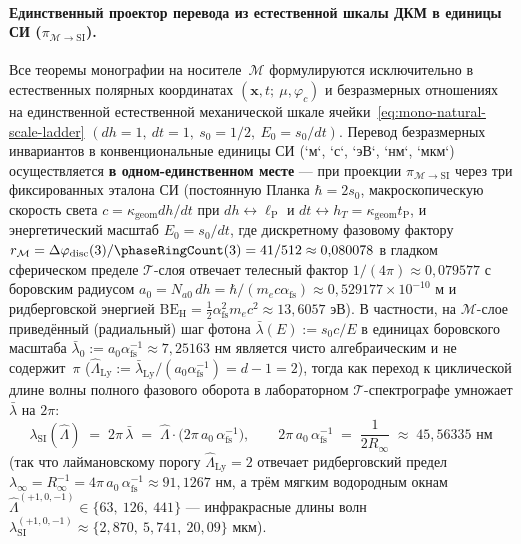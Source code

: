 \paragraph{Единственный проектор перевода из естественной шкалы ДКМ в единицы СИ ($\pi_{\mathcal{M}\to\mathrm{SI}}$).}
Все теоремы монографии на носителе~$\mathcal{M}$ формулируются исключительно в естественных полярных координатах $(\mathbf{x}, t;\ \mu, \varphi_c)$ и безразмерных отношениях на единственной естественной механической шкале ячейки~\eqref{eq:mono-natural-scale-ladder} $(dh = 1,\ dt = 1,\ s_0 = 1/2,\ E_0 = s_0/dt)$. Перевод безразмерных инвариантов в конвенциональные единицы СИ (`м`, `с`, `эВ`, `нм`, `мкм`) осуществляется \textbf{в одном-единственном месте} --- при проекции $\pi_{\mathcal{M}\to\mathrm{SI}}$ через три фиксированных эталона СИ (постоянную Планка $\hbar = 2 s_0$, макроскопическую скорость света $c = \kappa_{\mathrm{geom}} dh / dt$ при $dh \leftrightarrow \ell_{\mathrm{P}}$ и $dt \leftrightarrow h_T = \kappa_{\mathrm{geom}} t_{\mathrm{P}}$, и энергетический масштаб $E_0 = s_0 / dt$, где дискретному фазовому фактору $r_{\mathcal{M}} = \Delta\varphi_{\mathrm{disc}}(3)/\phaseRingCount(3) = 41/512 \approx 0{,}080078$ в гладком сферическом пределе $\mathcal{T}$-слоя отвечает телесный фактор $1/(4\pi) \approx 0{,}079577$ с боровским радиусом $a_0 = N_{a0}\,dh = \hbar / (m_e c \alpha_{\mathrm{fs}}) \approx 0{,}529177\times 10^{-10}\text{ м}$ и ридберговской энергией $\mathrm{BE}_{\mathrm{H}} = \frac{1}{2}\alpha_{\mathrm{fs}}^2 m_e c^2 \approx 13{,}6057\text{ эВ}$). В частности, на $\mathcal{M}$-слое приведённый (радиальный) шаг фотона $\bar{\lambda}(E) := s_0 c / E$ в единицах боровского масштаба $\bar{\lambda}_0 := a_0\alpha_{\mathrm{fs}}^{-1} \approx 7{,}25163\text{ нм}$ является чисто алгебраическим и не содержит~$\pi$ ($\widehat{\Lambda}_{\mathrm{Ly}} := \bar{\lambda}_{\mathrm{Ly}} / (a_0\alpha_{\mathrm{fs}}^{-1}) = d - 1 = 2$), тогда как переход к циклической длине волны полного фазового оборота в лабораторном $\mathcal{T}$-спектрографе умножает $\bar{\lambda}$ на $2\pi$:
\begin{equation}
  \label{eq:mono-si-wavelength-bridge}
  \lambda_{\mathrm{SI}}(\widehat{\Lambda}) \;=\; 2\pi\,\bar{\lambda} \;=\; \widehat{\Lambda}\cdot\bigl(2\pi\,a_0\,\alpha_{\mathrm{fs}}^{-1}\bigr),
  \qquad
  2\pi\,a_0\,\alpha_{\mathrm{fs}}^{-1} \;=\; \frac{1}{2 R_\infty} \;\approx\; 45{,}56335\text{ нм}
\end{equation}
(так что лаймановскому порогу $\widehat{\Lambda}_{\mathrm{Ly}} = 2$ отвечает ридберговский предел $\lambda_\infty = R_\infty^{-1} = 4\pi\,a_0\,\alpha_{\mathrm{fs}}^{-1} \approx 91{,}1267\text{ нм}$, а трём мягким водородным окнам $\widehat{\Lambda}^{(+1,0,-1)} \in \{63,\ 126,\ 441\}$ --- инфракрасные длины волн $\lambda_{\mathrm{SI}}^{(+1,0,-1)} \approx \{2{,}870,\ 5{,}741,\ 20{,}09\}\text{ мкм}$).

